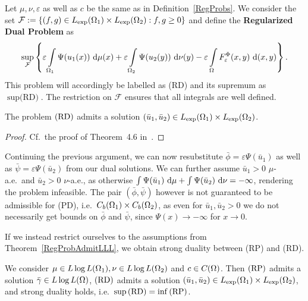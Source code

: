 \begin{definition}\label{RegDualProb}
	Let $\mu, \nu, \varepsilon$ as well as $c$ be the same as in Definition~\ref{RegProbs}. We consider the set $\mathcal{F} := \{ (f, g) \in \Lexp[\Omega_1] \times \Lexp[\Omega_2] : f, g \ge 0 \}$ and define the \textbf{Regularized Dual Problem} as
	\[ \sup\limits_{\mathcal{F}} \left\{ \varepsilon \int\limits_{\Omega_1} \Psi(u_1(x))~\Dx{\mu} + \varepsilon \int\limits_{\Omega_2} \Psi(u_2(y))~\Dx[y]{\nu} - \varepsilon \int\limits_{\Omega} F_{\varepsilon}^{\Phi}(x, y)~\Dx[x, y]{} \right\}. \]
	This problem will accordingly be labelled as (RD) and its supremum as $\sup \text{(RD)}$. The restriction on $\mathcal{F}$ ensures that all integrals are well defined.
\end{definition}

\begin{theorem}\label{RegDualAdmit}
	The problem$\text{\normalfont\ (RD)}$ admits a solution $(\bar{u}_1, \bar{u}_2) \in \Lexp[\Omega_1] \times \Lexp[\Omega_2]$.
\end{theorem}

\begin{proof}
	Cf.~the proof of Theorem~4.6 in~\cite{Cla2021}.
\end{proof}

Continuing the previous argument, we can now resubstitute $\bar{\phi} = \varepsilon \Psi(\bar{u}_1)$ as well as $\bar{\psi} = \varepsilon \Psi(\bar{u}_2)$ from our dual solutions. We can further assume $\bar{u}_1 > 0$ $\mu$-a.e.\ and $\bar{u}_2 > 0$ $\nu$-a.e., as otherwise $\int \Psi(\bar{u}_1)~\D + \int \Psi(\bar{u}_2)~\D[\nu] = -\infty$, rendering the problem infeasible. The pair $(\bar{\phi}, \bar{\psi})$ however is not guaranteed to be admissible for (PD), i.e.~$\CF[b]{\Omega_1} \times \CF[b]{\Omega_2}$, as even for $\bar{u}_1, \bar{u}_2 > 0$ we do not necessarily get bounds on $\bar{\phi}$ and $\bar{\psi}$, since $\Psi(x) \rightarrow -\infty$ for $x \rightarrow 0$.

If we instead restrict ourselves to the assumptions from Theorem~\ref{RegProbAdmitLLL}, we obtain strong duality between (RP) and (RD).

\begin{theorem}\label{RegStrongDualityLLL}
	We consider $\mu \in \LLL[\Omega_1], \nu \in \LLL[\Omega_2]$ and $c \in \CF{\Omega}$. Then$\text{\normalfont\ (RP)}$ admits a solution $\bar{\gamma} \in \LLL$,$\text{\normalfont\ (RD)}$ admits a solution $(\bar{u}_1, \bar{u}_2) \in \Lexp[\Omega_1] \times \Lexp[\Omega_2]$, and strong duality holds, i.e.\ $\sup\!\text{\normalfont\,(RD)} = \inf\!\text{\normalfont\,(RP)}$.
\end{theorem}

